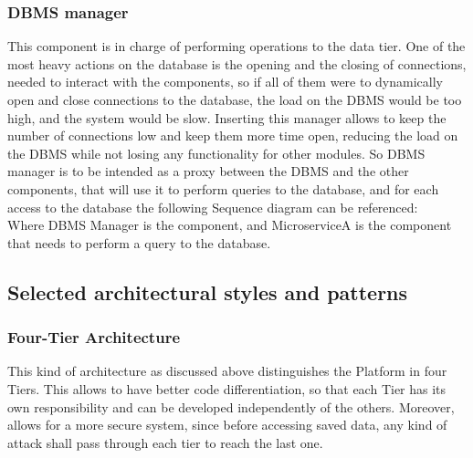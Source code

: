 \subsubsection{DBMS manager}
This component is in charge of performing operations to the data tier.
One of the most heavy actions on the database is the opening and the closing of connections, needed to interact with the components, so if all of them were to dynamically open and close connections to the database, the load on the DBMS would be too high, and the system would be slow. 
Inserting this manager allows to keep the number of connections low and keep them more time open, reducing the load on the DBMS while not losing any functionality for other modules. 
So DBMS manager is to be intended as a proxy between the DBMS and the other components, that will use it to perform queries to the database, and for each access to the database the following Sequence diagram can be referenced:\\
Where DBMS Manager is the component, and MicroserviceA is the component that needs to perform a query to the database. 

\subsection{Selected architectural styles and patterns}
\subsubsection{Four-Tier Architecture}
This kind of architecture as discussed above distinguishes the Platform in four Tiers. 
This allows to have better code differentiation, so that each Tier has its own responsibility and can be developed independently of the others. 
Moreover, allows for a more secure system, since before accessing saved data, any kind of attack shall pass through each tier to reach the last one.

